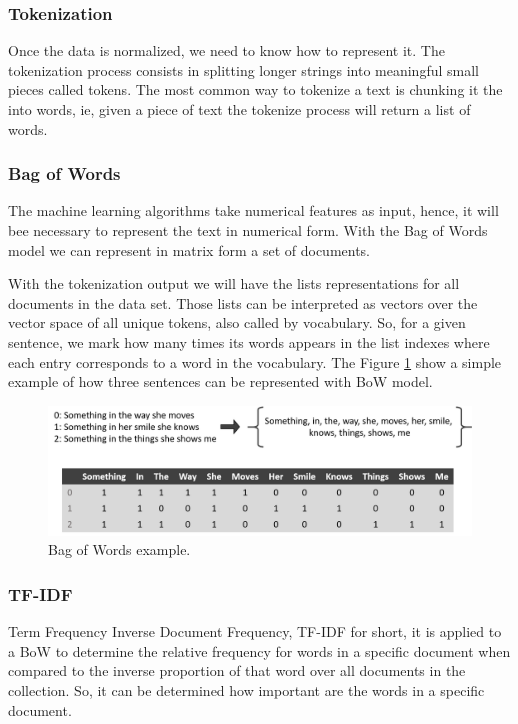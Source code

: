 	\subsubsection{Tokenization}
	Once the data is normalized, we need to know how to represent it. The tokenization process consists in splitting longer strings into meaningful small pieces called tokens. The most common way to tokenize a text is chunking it the into words, ie, given a piece of text the tokenize process will return a list of words. 
	
	\subsubsection{Bag of Words}
	The machine learning algorithms take numerical features as input, hence, it will bee necessary to represent the text in numerical form. With the Bag of Words model we can represent in matrix form a set of documents.
	
	With the tokenization output we will have the lists representations for all documents in the data set. Those lists can be interpreted as vectors over the vector space of all unique tokens, also called by vocabulary. So, for a given sentence, we mark how many times its words appears in the list indexes where each entry corresponds to a word in the vocabulary. The Figure \ref{fig:bag-of-words} show a simple example of how three sentences can be represented with BoW model.
	
	\begin{figure}[h!]
		\centering
		\includegraphics[width=\linewidth]{01.Chapters/02.Background/bag-of-words}
		\caption{Bag of Words example.}
		\label{fig:bag-of-words}
	\end{figure}
	
	\subsubsection{TF-IDF}
	
	Term Frequency Inverse Document Frequency, TF-IDF for short, it is applied to a BoW to determine the relative frequency for words in a specific document when compared to the inverse proportion of that word over all documents in the collection. So, it can be determined how important are the words in a specific document. 
	
